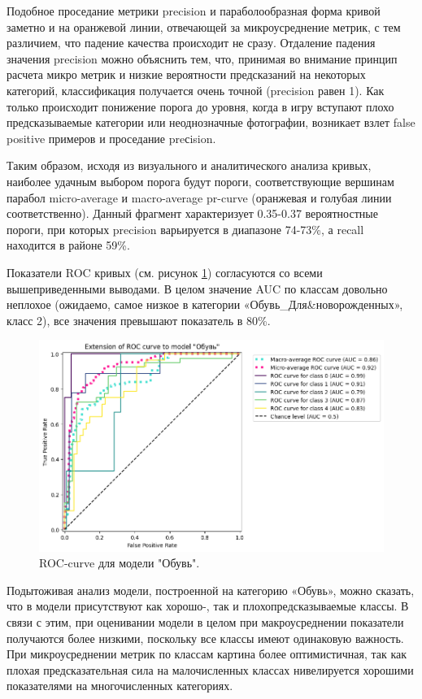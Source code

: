 \documentclass[a4paper,12pt]{extarticle}
\begin{document}
Подобное проседание метрики precision и параболообразная форма кривой заметно и на оранжевой линии, отвечающей за микроусреднение метрик, с тем различием, что падение качества происходит не сразу. Отдаление падения значения precision можно объяснить тем, что, принимая во внимание принцип расчета микро метрик и низкие вероятности предсказаний на некоторых категорий, классификация получается очень точной (precision равен 1). Как только происходит понижение порога до уровня, когда в игру вступают плохо предсказываемые категории или неоднозначные фотографии, возникает взлет false positive примеров и проседание preсision.

Таким образом, исходя из визуального и аналитического анализа кривых, наиболее удачным выбором порога будут пороги, соответствующие вершинам парабол micro-average и macro-average pr-curve (оранжевая и голубая линии соответственно). Данный фрагмент характеризует 0.35-0.37 вероятностные пороги, при которых precision варьируется в диапазоне 74-73\%, а recall находится в районе 59\%.

Показатели ROC кривых (см. рисунок \ref{fig:roccurve_Обувь2}) согласуются со всеми вышеприведенными выводами. В целом значение AUC по классам довольно неплохое (ожидаемо, самое низкое в категории «Обувь\_Для\&новорожденных», класс 2), все значения превышают показатель в 80\%.

\begin{figure}[ht]
	\centering
	\includegraphics[scale=0.6]{roc_curves/roccurve_Обувь.png}
	\caption{ROC-curve для модели "Обувь".}
	\label{fig:roccurve_Обувь2}
\end{figure}

Подытоживая анализ модели, построенной на категорию «Обувь», можно сказать, что в модели присутствуют как хорошо-, так и плохопредсказываемые классы. В связи с этим, при оценивании модели в целом при макроусреднении показатели получаются более низкими, поскольку все классы имеют одинаковую важность. При микроусреднении метрик по классам картина более оптимистичная, так как плохая предсказательная сила на малочисленных классах нивелируется хорошими показателями на многочисленных категориях.
\end{document}
